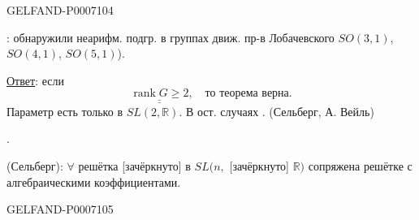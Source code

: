 \begin{GelfandAdjacentEvidence}{GELFAND-P000710}{4}


: обнаружили неарифм. подгр. в группах движ. пр-в Лобачевского
\(SO(3,1)\), \(SO(4,1)\), \(SO(5,1)\)).

\underline{Ответ}: если
\[
\underline{\underline{\operatorname{rank}G\ge 2}},\quad\text{то теорема верна.}
\]
Параметр есть только в \(SL(2,\mathbb R)\).
В ост. случаях . (Сельберг, А. Вейль)

.

 (Сельберг): \(\forall\) решётка
[зачёркнуто] в \(SL(n,\) [зачёркнуто] \(\mathbb R)\) сопряжена решётке с алгебраическими коэффициентами.
\end{GelfandAdjacentEvidence}
\begin{GelfandAdjacentEvidence}{GELFAND-P000710}{5}

\end{GelfandAdjacentEvidence}



